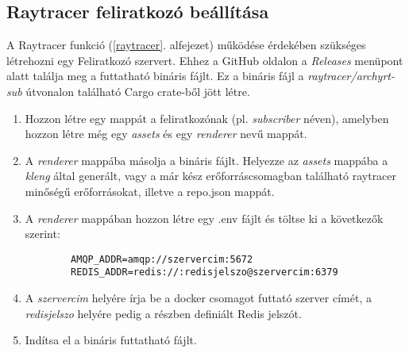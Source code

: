 \subsection{Raytracer feliratkozó beállítása}\label{subscriber}


A Raytracer funkció (\ref{raytracer}. alfejezet) működése érdekében szükséges létrehozni egy Feliratkozó szervert.
Ehhez a GitHub oldalon a \emph{Releases} menüpont alatt találja meg a futtatható bináris fájlt.
Ez a bináris fájl a \emph{raytracer/archyrt-sub} útvonalon található Cargo crate-ből jött létre.


\begin{enumerate}
    \item Hozzon létre egy mappát a feliratkozónak (pl. \emph{subscriber} néven), amelyben hozzon létre még egy \emph{assets} és egy \emph{renderer} nevű mappát.

    \item A \emph{renderer} mappába másolja a bináris fájlt. Helyezze az \emph{assets} mappába a \emph{kleng} által generált, vagy a már kész erőforráscsomagban található raytracer minőségű erőforrásokat, illetve a repo.json mappát.

    \item A \emph{renderer} mappában hozzon létre egy .env fájlt és töltse ki a következők szerint:
          \begin{lstlisting}
        AMQP_ADDR=amqp://szervercim:5672
        REDIS_ADDR=redis://:redisjelszo@szervercim:6379\end{lstlisting}

    \item A \emph{szervercim} helyére írja be a docker csomagot futtató szerver címét, a \emph{redisjelszo} helyére pedig a \textbf{} részben definiált Redis jelszót.

    \item Indítsa el a bináris futtatható fájlt.
\end{enumerate}
